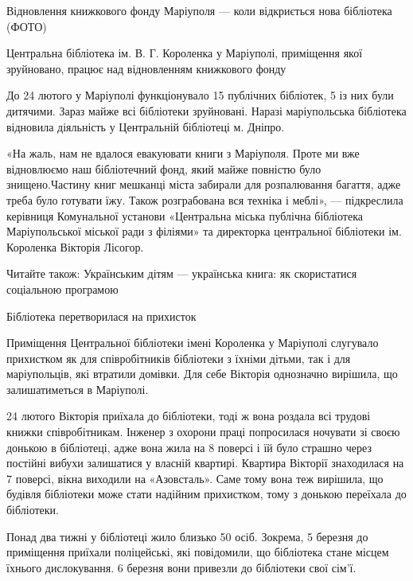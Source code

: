  
 
 
 
 

Відновлення книжкового фонду Маріуполя — коли відкриється нова бібліотека (ФОТО)

Центральна бібліотека ім. В. Г. Короленка у Маріуполі, приміщення якої
зруйновано, працює над відновленням книжкового фонду

До 24 лютого у Маріуполі функціонувало 15 публічних бібліотек, 5 із них були
дитячими. Зараз майже всі бібліотеки зруйновані. Наразі маріупольська
бібліотека відновила діяльність у Центральній бібліотеці м. Дніпро.

«На жаль, нам не вдалося евакуювати книги з Маріуполя. Проте ми вже відновлюємо
наш бібліотечний фонд, який майже повністю було знищено.Частину книг мешканці
міста забирали для розпалювання багаття, адже треба було готувати їжу. Також
розграбована вся техніка і меблі», — підкреслила керівниця Комунальної установи
«Центральна міська публічна бібліотека Маріупольської міської ради з філіями»
та директорка центральної бібліотеки ім. Короленка Вікторія Лісогор.

Читайте також: Українським дітям — українська книга: як скористатися соціальною
програмою

Бібліотека перетворилася на прихисток

Приміщення Центральної бібліотеки імені Короленка у Маріуполі слугувало
прихистком як для співробітників бібліотеки з їхніми дітьми, так і для
маріупольців, які втратили домівки. Для себе Вікторія однозначно вирішила, що
залишатиметься в Маріуполі.

24 лютого Вікторія приїхала до бібліотеки, тоді ж вона роздала всі трудові
книжки співробітникам. Інженер з охорони праці попросилася ночувати зі своєю
донькою в бібліотеці, адже вона жила на 8 поверсі і їй було страшно через
постійні вибухи залишатися у власній квартирі. Квартира Вікторії знаходилася на
7 поверсі, вікна виходили на «Азовсталь». Саме тому вона теж вирішила, що
будівля бібліотеки може стати надійним прихистком, тому з донькою переїхала до
бібліотеки.

Понад два тижні у бібліотеці жило близько 50 осіб. Зокрема, 5 березня до
приміщення приїхали поліцейські, які повідомили, що бібліотека стане місцем
їхнього дислокування. 6 березня вони привезли до бібліотеки свої сім'ї.

